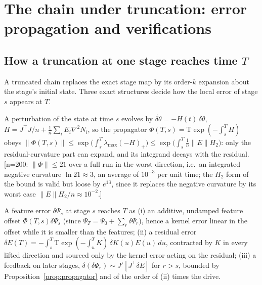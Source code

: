 \section{The chain under truncation: error propagation and verifications}
\label{app:chain}

\subsection{How a truncation at one stage reaches time $T$}
\label{ssec:chain-error}

A truncated chain replaces the exact stage map by its order-$k$ expansion about
the stage's initial state. Three exact structures decide how the local error
of stage $s$ appears at $T$.

\begin{proposition}
\label{prop:propagator}
A perturbation of the state at time $s$ evolves by $\dot{\delta\theta}=-H(t)\,\delta\theta$,
$H=J^{\!\top}J/n+\frac1n\sum_iE_i\nabla^2N_i$, so the propagator
$\Phi(T,s)=\mathrm{T}\!\exp(-\!\int_s^TH)$ obeys
$\|\Phi(T,s)\|\le\exp\!\big(\int_s^T\lambda_{\max}(-H)_+\big)\le\exp\!\big(\int_s^T\tfrac1n\|E\|H_2\big)$:
only the residual-curvature part can expand, and its integrand decays with the
residual. [n=200: $\|\Phi\|\le21$ over a full run in the worst direction, i.e.\ an
integrated negative curvature $\ln 21\approx3$, an average of $10^{-3}$ per unit
time; the $H_2$ form of the bound is valid but loose by $e^{13}$, since it
replaces the negative curvature by its worst case $\|E\|H_2/n\approx10^{-2}$.]
\end{proposition}

\begin{proposition}
\label{prop:channels}
A feature error $\delta\Psi_s$ at stage $s$ reaches $T$ as (i) an additive,
undamped feature offset $\Phi(T,s)\delta\Psi_s$ (since $\Psi_T=\Psi_0+\sum_r\delta\Psi_r$),
hence a kernel error linear in the offset while it is smaller than the
features; (ii) a residual error $\delta E(T)=-\int_s^T\mathrm{T}\!\exp(-\!\int_u^TK)\,\delta K(u)E(u)\,du$,
contracted by $K$ in every lifted direction and sourced only by the kernel
error acting on the residual; (iii) a feedback on later stages,
$\delta(\delta\Psi_r)\sim J'[J^{\!\top}\delta E]$ for $r>s$, bounded by
Proposition~\ref{prop:propagator} and of the order of (ii) times the drive.
\end{proposition}

